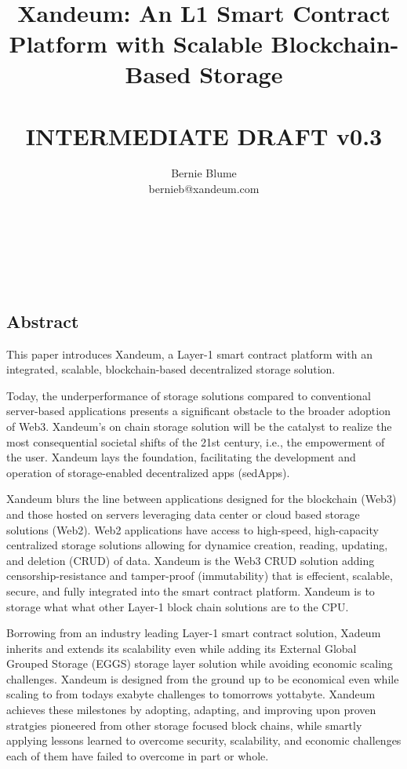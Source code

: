 \documentclass[11pt]{article}   	%
\title{%
\ \\
\ \\
\ \\
Xandeum: An L1 Smart Contract Platform with Scalable Blockchain-Based Storage \\
\ \\
\large INTERMEDIATE DRAFT v0.3}
\author{
{\rm Bernie Blume}\\
bernieb@xandeum.com
}
\begin{document}
\maketitle

\maketitle

\ \\
\ \\
\ \\

\subsection*{Abstract}
This paper introduces Xandeum, a Layer-1 smart contract platform with an integrated, scalable, blockchain-based decentralized storage solution.

Today, the underperformance of storage solutions compared to conventional server-based applications presents a significant obstacle to the broader adoption of Web3. Xandeum's on chain storage solution will be the catalyst to realize the most consequential societal shifts of the 21st century, i.e., the empowerment of the user. Xandeum lays the foundation, facilitating the development and operation of storage-enabled decentralized apps (sedApps).

Xandeum blurs the line between applications designed for the blockchain (Web3) and those hosted on servers leveraging data center or cloud based storage solutions (Web2). Web2 applications have access to high-speed, high-capacity centralized storage solutions allowing for dynamice creation, reading, updating, and deletion (CRUD) of data. Xandeum is the Web3 CRUD solution adding censorship-resistance and tamper-proof (immutability) that is effecient, scalable, secure, and fully integrated into the smart contract platform. Xandeum is to storage what what other Layer-1 block chain solutions are to the CPU.

Borrowing from an industry leading Layer-1 smart contract solution, Xadeum inherits and extends its scalability even while adding its External Global Grouped Storage (EGGS) storage layer solution while avoiding economic scaling challenges. Xandeum is designed from the ground up to be economical even while scaling to from todays exabyte challenges to tomorrows yottabyte. Xandeum achieves these milestones by adopting, adapting, and improving upon proven stratgies pioneered from other storage focused block chains, while smartly applying lessons learned to overcome security, scalability, and economic challenges each of them have failed to overcome in part or whole.
\end{document}
